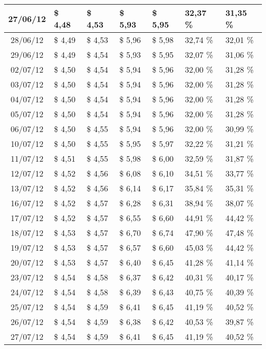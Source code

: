 \begin{center}
\begin{longtable}{|c|p{1.5cm}|p{1.5cm}|p{1.5cm}|p{1.5cm}|p{1.5cm}|p{1.5cm}|}
27/06/12 & \$ 4,48 & \$ 4,53 & \$ 5,93 & \$ 5,95 & 32,37 \% & 31,35 \% \\ \hline
28/06/12 & \$ 4,49 & \$ 4,53 & \$ 5,96 & \$ 5,98 & 32,74 \% & 32,01 \% \\ \hline
29/06/12 & \$ 4,49 & \$ 4,54 & \$ 5,93 & \$ 5,95 & 32,07 \% & 31,06 \% \\ \hline
02/07/12 & \$ 4,50 & \$ 4,54 & \$ 5,94 & \$ 5,96 & 32,00 \% & 31,28 \% \\ \hline
03/07/12 & \$ 4,50 & \$ 4,54 & \$ 5,94 & \$ 5,96 & 32,00 \% & 31,28 \% \\ \hline
04/07/12 & \$ 4,50 & \$ 4,54 & \$ 5,94 & \$ 5,96 & 32,00 \% & 31,28 \% \\ \hline
05/07/12 & \$ 4,50 & \$ 4,54 & \$ 5,94 & \$ 5,96 & 32,00 \% & 31,28 \% \\ \hline
06/07/12 & \$ 4,50 & \$ 4,55 & \$ 5,94 & \$ 5,96 & 32,00 \% & 30,99 \% \\ \hline
10/07/12 & \$ 4,50 & \$ 4,55 & \$ 5,95 & \$ 5,97 & 32,22 \% & 31,21 \% \\ \hline
11/07/12 & \$ 4,51 & \$ 4,55 & \$ 5,98 & \$ 6,00 & 32,59 \% & 31,87 \% \\ \hline
12/07/12 & \$ 4,52 & \$ 4,56 & \$ 6,08 & \$ 6,10 & 34,51 \% & 33,77 \% \\ \hline
13/07/12 & \$ 4,52 & \$ 4,56 & \$ 6,14 & \$ 6,17 & 35,84 \% & 35,31 \% \\ \hline
16/07/12 & \$ 4,52 & \$ 4,57 & \$ 6,28 & \$ 6,31 & 38,94 \% & 38,07 \% \\ \hline
17/07/12 & \$ 4,52 & \$ 4,57 & \$ 6,55 & \$ 6,60 & 44,91 \% & 44,42 \% \\ \hline
18/07/12 & \$ 4,53 & \$ 4,57 & \$ 6,70 & \$ 6,74 & 47,90 \% & 47,48 \% \\ \hline
19/07/12 & \$ 4,53 & \$ 4,57 & \$ 6,57 & \$ 6,60 & 45,03 \% & 44,42 \% \\ \hline
20/07/12 & \$ 4,53 & \$ 4,57 & \$ 6,40 & \$ 6,45 & 41,28 \% & 41,14 \% \\ \hline
23/07/12 & \$ 4,54 & \$ 4,58 & \$ 6,37 & \$ 6,42 & 40,31 \% & 40,17 \% \\ \hline
24/07/12 & \$ 4,54 & \$ 4,58 & \$ 6,39 & \$ 6,43 & 40,75 \% & 40,39 \% \\ \hline
25/07/12 & \$ 4,54 & \$ 4,59 & \$ 6,41 & \$ 6,45 & 41,19 \% & 40,52 \% \\ \hline
26/07/12 & \$ 4,54 & \$ 4,59 & \$ 6,38 & \$ 6,42 & 40,53 \% & 39,87 \% \\ \hline
27/07/12 & \$ 4,54 & \$ 4,59 & \$ 6,41 & \$ 6,45 & 41,19 \% & 40,52 \% \\ \hline

\end{longtable}
\end{center}
